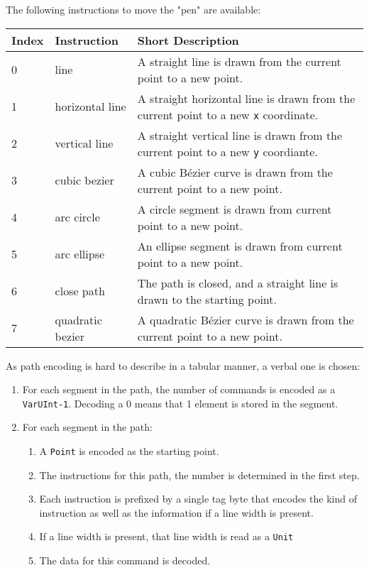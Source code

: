 \documentclass[]{article}
\providecommand{\tightlist}{%
  \setlength{\itemsep}{0pt}\setlength{\parskip}{0pt}}
\begin{document}
The following instructions to move the "pen" are available:

\begin{longtable}[]{@{}p{0.5in}p{1.0in}p{4.5in}@{}}
\toprule
Index & Instruction & Short Description \\
\midrule
\endhead
0 & line             & A straight line is drawn from the current point to a new point. \\
1 & horizontal line  & A straight horizontal line is drawn from the current point to a new \texttt{x} coordinate. \\
2 & vertical line    & A straight vertical line is drawn from the current point to a new \texttt{y} coordiante. \\
3 & cubic bezier     & A cubic Bézier curve is drawn from the current point to a new point. \\
4 & arc circle       & A circle segment is drawn from current point to a new point. \\
5 & arc ellipse      & An ellipse segment is drawn from current point to a new point. \\
6 & close path       & The path is closed, and a straight line is drawn to the starting point. \\
7 & quadratic bezier & A quadratic Bézier curve is drawn from the current point to a new point. \\
\bottomrule
\end{longtable}

As path encoding is hard to describe in a tabular manner, a verbal one
is chosen:

\begin{enumerate}
\def\labelenumi{\arabic{enumi}.}
\tightlist
\item
  For each segment in the path, the number of commands is encoded as a
  \texttt{VarUInt-1}. Decoding a 0 means that 1 element is stored in the segment.
\item
  For each segment in the path:

  \begin{enumerate}
  \def\labelenumii{\arabic{enumii}.}
  \tightlist
  \item
    A \texttt{Point} is encoded as the starting point.
  \item
    The instructions for this path, the number is determined in the
    first step.
  \item
    Each instruction is prefixed by a single tag byte that encodes the
    kind of instruction as well as the information if a line width is
    present.
  \item
    If a line width is present, that line width is read as a
    \texttt{Unit}
  \item
    The data for this command is decoded.
  \end{enumerate}
\end{enumerate}
\end{document}

